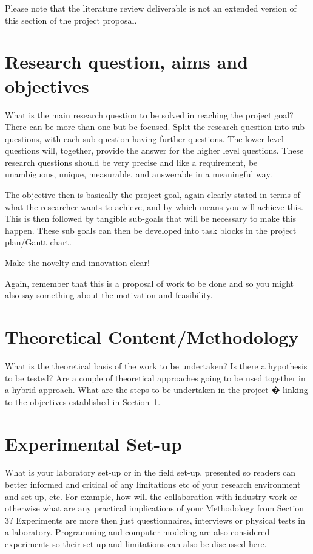 \documentclass{article}
\begin{document}
Please note that the literature review deliverable is not an extended version of this section of the project proposal.

\section{Research question, aims and objectives}
\label{sec:objective}

What is the main research question to be solved in reaching the project goal? There can be more than one but be focused. Split the research question into sub-questions, with each sub-question having further questions. The lower level questions will, together, provide the answer for the higher level questions. These research questions should be very precise and like a requirement, be unambiguous, unique, measurable, and answerable in a meaningful way.

The objective then is basically the project goal, again clearly stated in terms of what the researcher wants to achieve, and by which means you will achieve this. This is then followed by tangible sub-goals that will be necessary to make this happen. These sub goals can then be developed into task blocks in the project plan/Gantt chart.

Make the novelty and innovation clear!

Again, remember that this is a proposal of work to be done and so you might also say something about the motivation and feasibility.


\section{Theoretical Content/Methodology}
\label{sec:theory}

What is the theoretical basis of the work to be undertaken? Is there a hypothesis to be tested? Are a couple of theoretical approaches going to be used together in a hybrid approach. What are the steps to be undertaken in the project � linking to the objectives established in Section~\ref{sec:objective}.

\section{Experimental Set-up}
\label{sec:experiment}

What is your laboratory set-up or in the field set-up, presented so readers can better informed and critical of any limitations etc of your research environment and set-up, etc. For example, how will the collaboration with industry work or otherwise what are any practical implications of your Methodology from Section 3? Experiments are more then just questionnaires, interviews or physical tests in a laboratory. Programming and computer modeling are also considered experiments so their set up and limitations can also be discussed here.
\end{document}
